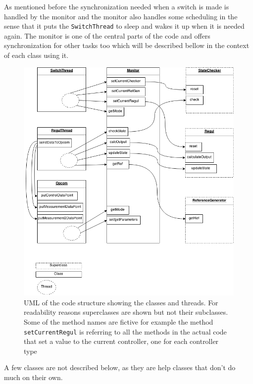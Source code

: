 As mentioned before the synchronization needed when a switch is made is handled by the monitor and the monitor also handles some scheduling in the sense that it puts the \texttt{SwitchThread} to sleep and wakes it up when it is needed again.
The monitor is one of the central parts of the code and offers synchronization for other tasks too which will be described bellow in the context of each class using it. 
\begin{figure}
\centering
\includegraphics[width=\textwidth]{figures/UML.png}
\caption{UML of the code structure showing the classes and threads. For readability reasons superclasses are shown but not their subclasses. Some of the method names are fictive for example the method \texttt{setCurrentRegul} is referring to all the methods in the actual code that set a value to the current controller, one for each controller type}
\label{overall_fig}
\end{figure}

A few classes are not described below, as they are help classes that don't do much on their own. %



